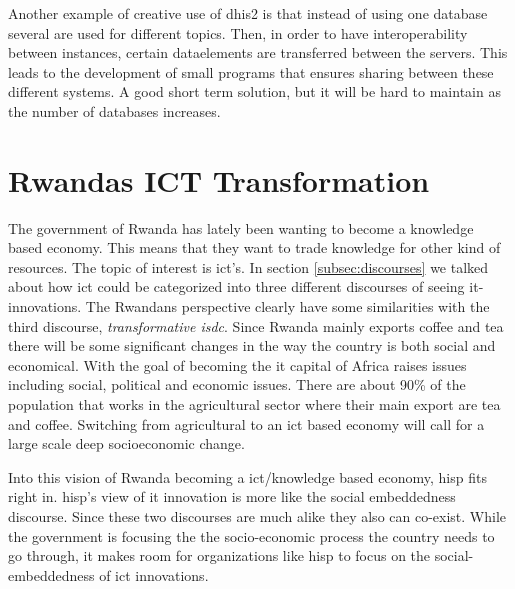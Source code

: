 Another example of creative use of \gls{dhis2} is that instead of using one database several are used for different topics. Then, in order to have interoperability between instances, certain dataelements are transferred between the servers. This leads to the development of small programs that ensures sharing between these different systems. 
A good short term solution, but it will be hard to maintain as the number of databases increases.


\section{Rwandas ICT Transformation}
The government of Rwanda has lately been wanting to become a knowledge based economy. 
This means that they want to trade knowledge for other kind of resources. 
The topic of interest is \gls{ict}'s.
In section \ref{subsec:discourses} we talked about how \gls{ict} could be categorized into three different discourses of seeing \gls{it}-innovations. 
The Rwandans perspective clearly have some similarities with the third discourse, \textit{transformative \gls{isdc}}. 
Since Rwanda mainly exports coffee and tea there will be some significant changes in the way the country is both social and economical. 
With the goal of becoming the \gls{it} capital of Africa raises issues including social, political and economic issues. 
There are about 90\% of the population that works in the agricultural sector where their main export are tea and coffee. 
Switching from agricultural to an \gls{ict} based economy will call for a large scale deep socioeconomic change.

Into this vision of Rwanda becoming a \gls{ict}/knowledge based economy, \gls{hisp} fits right in.
\gls{hisp}'s view of \gls{it} innovation is more like the social embeddedness discourse.
Since these two discourses are much alike they also can co-exist. While the government is focusing the the socio-economic process the country needs to go through, it makes room for organizations like \gls{hisp} to focus on the social-embeddedness of \gls{ict} innovations.

